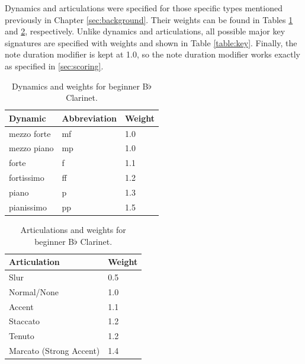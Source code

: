 \documentclass[12pt]{report}
\begin{document}
Dynamics and articulations were specified for those specific types mentioned previously in Chapter \ref{sec:background}. Their weights can be found in Tables \ref{table:dynamics} and \ref{table:articulations}, respectively. Unlike dynamics and articulations, all possible major key signatures are specified with weights and shown in Table \ref{table:key}. Finally, the note duration modifier is kept at 1.0, so the note duration modifier works exactly as specified in \ref{sec:scoring}.

\begin{table}
	\centering
	\caption{Dynamics and weights for beginner B$\flat$ Clarinet.}
	\label{table:dynamics}
    \begin{tabular}{| l | l | l |}
        \hline
        Dynamic & Abbreviation & Weight \\ \hline
        mezzo forte & mf & 1.0 \\ \hline
        mezzo piano & mp & 1.0 \\ \hline
        forte & f & 1.1 \\ \hline
        fortissimo & ff & 1.2 \\ \hline
        piano & p & 1.3 \\ \hline
        pianissimo & pp & 1.5 \\
        \hline
    \end{tabular}
\end{table}

\begin{table}
	\centering
	\caption{Articulations and weights for beginner B$\flat$ Clarinet.}
    \begin{tabular}{| l | l |}
        \hline
        Articulation & Weight \\ \hline
        Slur & 0.5 \\ \hline
        Normal/None & 1.0 \\ \hline
        Accent & 1.1 \\ \hline
        Staccato & 1.2 \\ \hline
        Tenuto & 1.2 \\ \hline
        Marcato (Strong Accent) & 1.4 \\
        \hline
    \end{tabular}
	\label{table:articulations}
\end{table}
\end{document}
